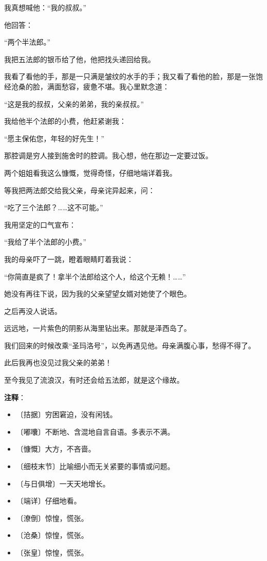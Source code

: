 \documentclass[12pt,UTF-8,openany]{ctexbook}
\begin{document}
\begin{large}
    我真想喊他：“我的叔叔。”
    
    他回答：
    
    “两个半法郎。”
    
    我把五法郎的银币给了他，他把找头递回给我。
    
    我看了看他的手，那是一只满是皱纹的水手的手；我又看了看他的脸，那是一张饱经沧桑的脸，满面愁容，疲惫不堪。我心里默念道：
    
    “这是我的叔叔，父亲的弟弟，我的亲叔叔。”
    
    我给他半个法郎的小费，他赶紧谢我：
    
    “愿主保佑您，年轻的好先生！”
    
    那腔调是穷人接到施舍时的腔调。我心想，他在那边一定要过饭。
    
    两个姐姐看我这么慷慨，觉得奇怪，仔细地端详着我。
    
    等我把两法郎交给我父亲，母亲诧异起来，问：
    
    “吃了三个法郎？……这不可能。”
    
    我用坚定的口气宣布：
    
    “我给了半个法郎的小费。”
    
    我的母亲吓了一跳，瞪着眼睛盯着我说：
    
    “你简直是疯了！拿半个法郎给这个人，给这个无赖！……”
    
    她没有再往下说，因为我的父亲望望女婿对她使了个眼色。
    
    之后再没人说话。
    
    远远地，一片紫色的阴影从海里钻出来。那就是泽西岛了。
    
    我们回来的时候改乘“圣玛洛号”，以免再遇见他。母亲满腹心事，愁得不得了。
    
    此后我再也没见过我父亲的弟弟！
    
    至今我见了流浪汉，有时还会给五法郎，就是这个缘故。
    
\end{large}


\newpage

\textbf{注释}：

\vspace{-1em}

\begin{itemize}
    \setlength\itemsep{-0.2em}
    \item 〔拮据〕穷困窘迫，没有闲钱。
    \item 〔嘟囔〕不断地、含混地自言自语。多表示不满。
    \item 〔慷慨〕大方，不吝啬。
    \item 〔细枝末节〕比喻细小而无关紧要的事情或问题。
    \item 〔与日俱增〕一天天地增长。
    \item 〔端详〕仔细地看。
    \item 〔潦倒〕惊惶，慌张。
    \item 〔沧桑〕惊惶，慌张。
    \item 〔张皇〕惊惶，慌张。
\end{itemize}
\end{document}
